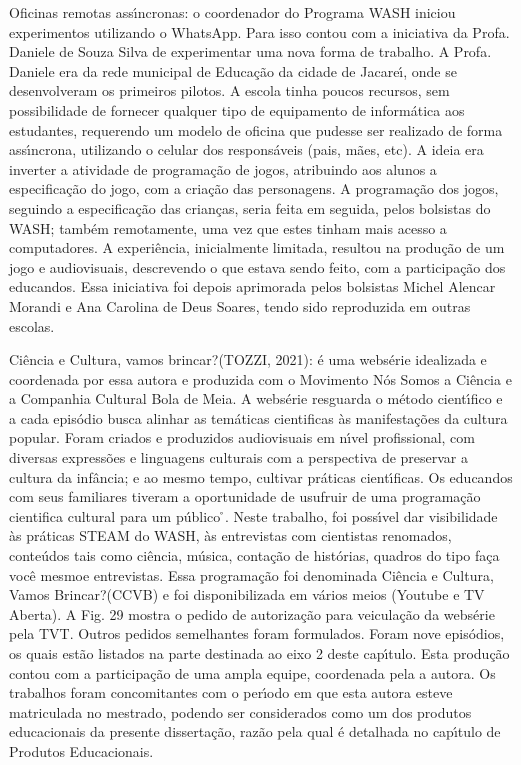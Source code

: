 \documentclass[
12pt,		%
openright,	%
twoside,  %
a4paper,			%
chapter=TITLE,		%
english,			%
french,				%
spanish,			%
brazil				%
]{USPSC-classe/USPSC}
\begin{document}
\begin{alineas}
\item Oficinas remotas ass\'{\i}ncronas: o coordenador do Programa WASH iniciou experimentos utilizando o WhatsApp. Para isso contou com a iniciativa da Profa. Daniele de Souza Silva de experimentar uma nova forma de trabalho. A Profa. Daniele era da rede municipal de Educa\c{c}\~ao da cidade de Jacare\'{\i}, onde se desenvolveram os primeiros pilotos. A escola tinha poucos recursos, sem possibilidade de fornecer qualquer tipo de equipamento de inform\'atica aos estudantes, requerendo um modelo de oficina que pudesse ser realizado de forma ass\'{\i}ncrona, utilizando o celular dos respons\'aveis (pais, m\~aes, etc). A ideia era inverter a atividade de programa\c{c}\~ao de jogos, atribuindo aos alunos a especifica\c{c}\~ao do jogo, com a cria\c{c}\~ao das personagens. A programa\c{c}\~ao dos jogos, seguindo a especifica\c{c}\~ao das crian\c{c}as, seria feita em seguida, pelos bolsistas do WASH; tamb\'em remotamente, uma vez que estes tinham mais acesso a computadores. A experi\^encia, inicialmente limitada, resultou na produ\c{c}\~ao de um jogo e audiovisuais, descrevendo o que estava sendo feito, com a participa\c{c}\~ao dos educandos. Essa iniciativa foi depois aprimorada pelos bolsistas Michel Alencar Morandi e Ana Carolina de Deus Soares, tendo sido reproduzida em outras escolas.
\item \textquotedbl Ci\^encia e Cultura, vamos brincar?\textquotedbl   (TOZZI, 2021): \'e uma webs\'erie idealizada  e coordenada por essa  autora e produzida com o Movimento N\'os Somos a Ci\^encia e a Companhia Cultural Bola de Meia. A webs\'erie resguarda o m\'etodo cient\'{\i}fico e a cada epis\'odio  busca  alinhar as tem\'aticas cientificas \`as manifesta\c{c}\~oes  da cultura popular.  Foram criados e produzidos audiovisuais em n\'{\i}vel profissional, com diversas express\~oes e linguagens culturais  com a perspectiva de preservar a cultura da inf\^ancia; e ao mesmo tempo,  cultivar pr\'aticas cient\'{\i}ficas.  Os educandos com seus familiares tiveram a oportunidade de usufruir de uma programa\c{c}\~ao cientifica cultural para um p\'ublico \r\nintergeracional. Neste trabalho, foi poss\'{\i}vel dar visibilidade \`as pr\'aticas STEAM do WASH,  \`as entrevistas com cientistas renomados, conte\'udos tais como ci\^encia, m\'usica, conta\c{c}\~ao de hist\'orias, quadros do tipo \textquotedbl fa\c{c}a voc\^e mesmo\textquotedbl  e entrevistas. Essa programa\c{c}\~ao foi denominada \textquotedbl Ci\^encia e Cultura, Vamos Brincar?\textquotedbl  (CCVB) e foi disponibilizada em v\'arios meios (Youtube e TV Aberta). A Fig. 29 mostra o pedido de autoriza\c{c}\~ao para veicula\c{c}\~ao da webs\'erie pela TVT. Outros pedidos semelhantes foram formulados. Foram nove epis\'odios, os quais est\~ao listados na parte destinada ao eixo 2 deste cap\'{\i}tulo. Esta produ\c{c}\~ao contou com a participa\c{c}\~ao de uma ampla equipe, coordenada pela a autora. Os trabalhos foram concomitantes com o per\'{\i}odo em que esta autora esteve matriculada no mestrado, podendo ser considerados como um dos produtos educacionais da presente disserta\c{c}\~ao, raz\~ao pela qual \'e detalhada no cap\'{\i}tulo de Produtos Educacionais.
\end{alineas}
\end{document}
